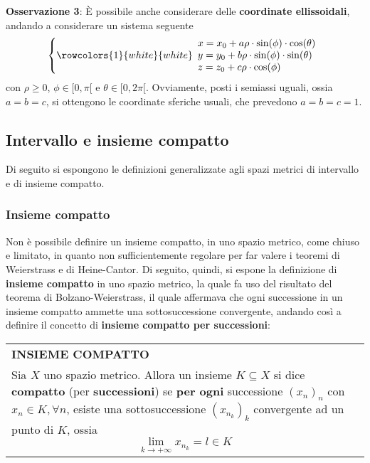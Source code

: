 \documentclass[a4paper]{extarticle}
\renewcommand\arraystretch{}
\begin{document}
\vspace{1em}
\noindent
\textbf{Osservazione 3}: È possibile anche considerare delle \textbf{coordinate ellissoidali}, andando a considerare un sistema seguente
\[
\left\{
    \rowcolors{1}{white}{white}
    \begin{array}{l}
        
        x=x_0 + a \rho \cdot \sin(\phi) \cdot \cos(\theta)\\
        y=y_0 + b \rho \cdot \sin(\phi) \cdot \sin(\theta)\\
        z=z_0 + c \rho \cdot \cos(\phi)
    \end{array}  
    \right.
\]
con $\rho \geq 0$, $\phi \in [0,\pi[$ e $\theta \in [0,2\pi[$. Ovviamente, posti i semiassi uguali, ossia $a=b=c$, si ottengono le coordinate sferiche usuali, che prevedono $a=b=c=1$.

\newpage
\noindent
\subsection{Intervallo e insieme compatto}
Di seguito si espongono le definizioni generalizzate agli spazi metrici di intervallo e di insieme compatto.

\vspace{1em}
\noindent
\subsubsection{Insieme compatto}
Non è possibile definire un insieme compatto, in uno spazio metrico, come chiuso e limitato, in quanto non sufficientemente regolare per far valere i teoremi di Weierstrass e di Heine-Cantor. Di seguito, quindi, si espone la definizione di \textbf{insieme compatto} in uno spazio metrico, la quale fa uso del risultato del teorema di Bolzano-Weierstrass, il quale affermava che ogni successione in un insieme compatto ammette una sottosuccessione convergente, andando così a definire il concetto di \textbf{insieme compatto per successioni}:

\vspace{1em}
\setlength{\tabcolsep}{14pt}
\renewcommand{\arraystretch}{2}
\noindent
\begin{tabularx}{\textwidth}{@{}|P|@{}}
    \hline
    {\textbf{INSIEME COMPATTO}}\\
    \parbox{\linewidth}{Sia $X$ uno spazio metrico. Allora un insieme $K \subseteq X$ si dice \textbf{compatto} (per \textbf{successioni}) se \textbf{per ogni} successione $(x_n)_n$ con $x_n \in K, \forall n$, esiste una sottosuccessione $(x_{n_k})_k$ convergente ad un punto di $K$, ossia
    \[\lim_{k \to +\infty} x_{n_k} = l \in K\] \vspace{-1mm}}\\
    \hline
\end{tabularx}
\end{document}
